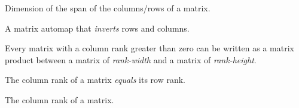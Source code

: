 \begin{multicols}{3}
  Dimension of the span of the columns/rows of a matrix.

  A matrix automap that \textit{inverts} rows and columns.

  Every matrix with a column rank greater than zero
  can be written as a matrix product between
  a matrix of \textit{rank-width} and a matrix of \textit{rank-height}.

  The column rank of a matrix \textit{equals} its row rank.

  The column rank of a matrix.
  

\end{multicols}


